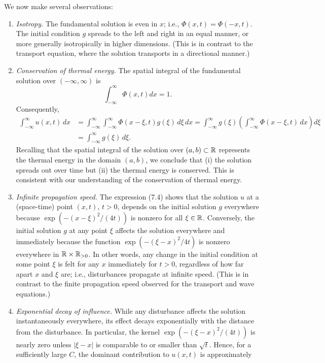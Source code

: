 We now make several observations:
\begin{enumerate}
    \item \textit{Isotropy.} The fundamental solution is even in $x$; i.e., $\Phi(x, t) = \Phi(-x, t)$. The initial condition $g$ spreads to the left and right in an equal manner, or more generally isotropically in higher dimensions. (This is in contrast to the transport equation, where the solution transports in a directional manner.)
    \item \textit{Conservation of thermal energy.} The spatial integral of the fundamental solution over $(-\infty, \infty)$ is
    \[\int_{-\infty}^{\infty} \Phi(x, t) dx = 1.\]
    Consequently,
    \begin{align*}
        \int_{-\infty}^{\infty} u(x, t)\,dx &= \int_{-\infty}^{\infty} \int_{-\infty}^{\infty} \Phi(x - \xi, t) g(\xi)\,d\xi\,dx = \int_{-\infty}^{\infty} g(\xi) \left(\int_{-\infty}^{\infty} \Phi(x - \xi, t)\,dx\right) d\xi \\
        &= \int_{-\infty}^{\infty} g(\xi)\,d\xi.
    \end{align*}
    Recalling that the spatial integral of the solution over $(a, b) \subset \mathbb{R}$ represents the thermal energy in the domain $(a, b)$, we conclude that (i) the solution spreads out over time but (ii) the thermal energy is conserved. This is consistent with our understanding of the conservation of thermal energy.
    \item \textit{Infinite propagation speed.} The expression (7.4) shows that the solution $u$ at a (space-time) point $(x, t)$, $t > 0$, depends on the initial solution $g$ everywhere because $\exp(-(x - \xi)^2/(4t))$ is nonzero for all $\xi \in \mathbb{R}$. Conversely, the initial solution $g$ at any point $\xi$ affects the solution everywhere and immediately because the function $\exp(-(\xi - x)^2/4t)$ is nonzero everywhere in $\mathbb{R} \times \mathbb{R}_{>0}$. In other words, any change in the initial condition at some point $\xi$ is felt for any $x$ immediately for $t > 0$, regardless of how far apart $x$ and $\xi$ are; i.e., disturbances propagate at infinite speed. (This is in contrast to the finite propagation speed observed for the transport and wave equations.)
    \item \textit{Exponential decay of influence.} While any disturbance affects the solution instantaneously everywhere, its effect decays exponentially with the distance from the disturbance. In particular, the kernel $\exp(-(\xi - x)^2/(4t))$ is nearly zero unless $|\xi - x|$ is comparable to or smaller than $\sqrt{t}$. Hence, for a sufficiently large $C$, the dominant contribution to $u(x, t)$ is approximately

\end{enumerate}
